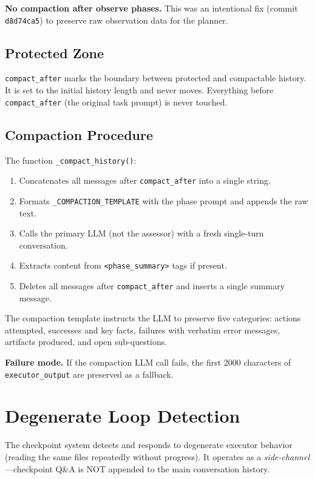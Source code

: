 \documentclass[11pt,letterpaper]{report}
\newcommand{\code}[1]{\texttt{#1}}
\begin{document}
\noindent\textbf{No compaction after observe phases.}
This was an intentional fix (commit \code{d8d74ca5}) to preserve raw
observation data for the planner.

\subsection{Protected Zone}

\code{compact\_after} marks the boundary between protected
and compactable history. It is set to the initial history length and
never moves. Everything before \code{compact\_after} (the original
task prompt) is never touched.

\subsection{Compaction Procedure}

The function \code{\_compact\_history()}:

\begin{enumerate}[nosep]
  \item Concatenates all messages after \code{compact\_after} into a
        single string.
  \item Formats \code{\_COMPACTION\_TEMPLATE}
        with the phase prompt and appends the raw text.
  \item Calls the primary LLM (not the assessor) with a fresh
        single-turn conversation.
  \item Extracts content from \code{<phase\_summary>} tags if present.
  \item Deletes all messages after \code{compact\_after} and inserts a
        single summary message.
\end{enumerate}

The compaction template instructs the LLM to preserve five categories:
actions attempted, successes and key facts, failures with verbatim error
messages, artifacts produced, and open sub-questions.

\noindent\textbf{Failure mode.}
If the compaction LLM call fails, the first 2000 characters of
\code{executor\_output} are preserved as a fallback.


\section{Degenerate Loop Detection}
\label{sec:degenerate}

The checkpoint system detects and responds to degenerate executor
behavior (reading the same files repeatedly without progress). It
operates as a \emph{side-channel}---checkpoint Q\&A is NOT appended to
the main conversation history.
\end{document}
